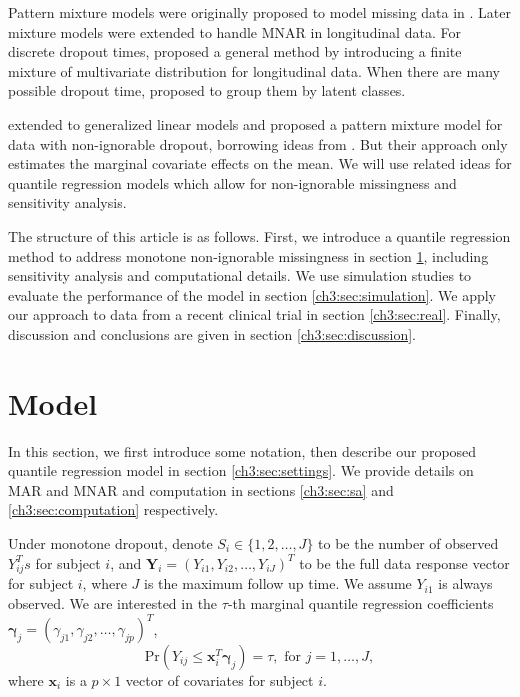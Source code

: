 \documentclass[useAMS,usenatbib,referee]{biom}
\newcommand{\prob}{\mbox{Pr}}
\begin{document}
Pattern mixture models were originally proposed to model missing data
in \citet{rubin1977}. Later mixture models were extended to handle
MNAR in longitudinal data. For discrete dropout times,
\citet{little1993, little1994} proposed a general method by
introducing a finite mixture of multivariate distribution for
longitudinal data. When there are many possible dropout time,
\citet{roy2003} proposed to group them by latent classes.

\citet{roy2008} extended \citet{roy2003} to generalized linear models
and proposed a pattern mixture model for data with non-ignorable
dropout, borrowing ideas from \citet{heagerty1999}.  But their
approach only estimates the marginal covariate effects on the mean. We
will use related ideas for quantile regression models which allow for
non-ignorable missingness and sensitivity analysis.

The structure of this article is as follows. First, we introduce a
quantile regression method to address monotone non-ignorable
missingness in section \ref{ch3:sec:model}, including sensitivity analysis
and computational details.  We use simulation studies to evaluate the
performance of the model in section \ref{ch3:sec:simulation}. We apply our
approach to data from a recent clinical trial in section
\ref{ch3:sec:real}. Finally, discussion and conclusions are given in
section \ref{ch3:sec:discussion}.

\section{Model}
\label{ch3:sec:model}

In this section, we first introduce some notation, then describe our proposed quantile regression model in section \ref{ch3:sec:settings}.
We provide details on MAR and MNAR and computation in sections \ref{ch3:sec:sa} and \ref{ch3:sec:computation} respectively.

Under monotone dropout, denote $S_i \in \{1, 2, \ldots, J\}$ to be the number of observed $Y_{ij}^{T} s$ for subject $i$,
and $\bm Y_i = (Y_{i1}, Y_{i2}, \ldots, Y_{iJ})^{T}$ to be the full data response vector for subject $i$, where $J$ is the maximum follow up time.
We assume $Y_{i1}$ is always observed.
We are interested in the $\tau$-th marginal quantile regression coefficients $\bm \gamma_j = (\gamma_{j1}, \gamma_{j2}, \ldots, \gamma_{jp})^T$,
\begin{equation}\label{eq:marg}
  \prob (Y_{ij} \leq \bm x_i^{T} \bm \gamma_j ) = \tau, \mbox{ for } j = 1, \ldots, J,
\end{equation}
where $\bm x_i$ is a $p \times 1$ vector of covariates for subject
$i$.
\end{document}
